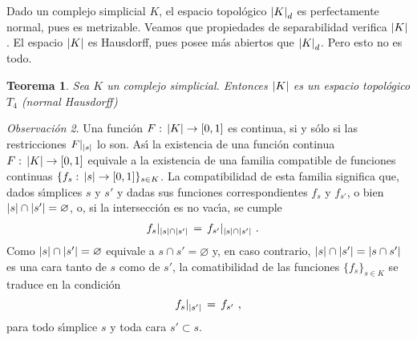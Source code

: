 \theoremstyle{plain}
\newtheorem{teoTodoComplejoEsNormal}{Teorema}[section]
\newtheorem{coroTodoComplejoEsPerfectamenteNormal}[teoTodoComplejoEsNormal]%
	{Corolario}
\newtheorem{coroCompactoContenidoEnFinitosSimplices}[teoTodoComplejoEsNormal]%
	{Corolario}
\newtheorem{coroComplejoFinitoEspacioCompacto}[teoTodoComplejoEsNormal]%
	{Corolario}
\newtheorem{coroTodoComplejoEsCompactamenteGenerado}[teoTodoComplejoEsNormal]%
	{Corolario}
\newtheorem{coroComplejoLocalmenteFinitoEspacioLocalmenteCompacto}%
	[teoTodoComplejoEsNormal]{Corolario}
\newtheorem{teoHomotopiasDeComplejos}[teoTodoComplejoEsNormal]{Teorema}
\newtheorem{coroSimpliceDeSubcomplejo}[teoTodoComplejoEsNormal]{Corolario}
\newtheorem{teoTodoComplejoEsNervio}[teoTodoComplejoEsNormal]{Teorema}

\theoremstyle{remark}
\newtheorem{obsFuncionesContinuasEnUnComplejo}[teoTodoComplejoEsNormal]%
	{Observaci\'{o}n}


Dado un complejo simplicial $K$, el espacio topol\'{o}gico $\left|K\right|_{d}$
es perfectamente normal, pues es metrizable. Veamos que propiedades de
separabilidad verifica $\left|K\right|$. El espacio $\left|K\right|$ es Hausdorff, pues
posee m\'{a}s abiertos que $\left|K\right|_{d}$. Pero esto no es todo.

\begin{teoTodoComplejoEsNormal}\label{thm:todocomplejoesnormal}
	Sea $K$ un complejo simplicial. Entonces $\left|K\right|$ es un
	espacio topol\'{o}gico $T_{4}$ (normal Hausdorff)
\end{teoTodoComplejoEsNormal}

\begin{obsFuncionesContinuasEnUnComplejo}%
	\label{obs:funcionescontinuasenuncomplejo}
	Una funci\'{o}n $F:\,\left|K\right|\rightarrow [0,1]$ es continua, si y
	s\'{o}lo si las restricciones $F|_{\left|s\right|}$ lo son. As\'{\i} la
	existencia de una funci\'{o}n continua $F:\,\left|K\right|\rightarrow [0,1]$
	equivale a la existencia de una familia compatible de funciones
	continuas $\{f_{s}:\,\left|s\right|\rightarrow [0,1]\}_{s\in K}$. La
	compatibilidad de esta familia significa que, dados s\'{\i}mplices
	$s$ y $s'$ y dadas sus funciones correspondientes $f_{s}$ y $f_{s'}$,
	o bien $\left|s\right|\cap\left|s'\right|=\varnothing$, o, si la intersecci\'{o}n
	es no vac\'{\i}a, se cumple
	\begin{align*}
		f_{s}|_{\left|s\right|\cap\left|s'\right|} & \,=\,
			f_{s'}|_{\left|s\right|\cap\left|s'\right|}
		\text{ .}
	\end{align*}
	Como $\left|s\right|\cap\left|s'\right|=\varnothing$ equivale a
	$s\cap s'=\varnothing$ y, en caso contrario,
	$\left|s\right|\cap\left|s'\right|=\left|s\cap s'\right|$ es una cara tanto de $s$ como
	de $s'$, la comatibilidad de las funciones $\{f_{s}\}_{s\in K}$ se
	traduce en la condici\'{o}n
	\begin{equation}
		\label{eq:funcionescontinuasenuncomplejo}
		f_{s}|_{\left|s'\right|} \,=\,f_{s'}
		\text{ ,}
	\end{equation}
	para todo s\'{\i}mplice $s$ y toda cara $s'\subset s$.
\end{obsFuncionesContinuasEnUnComplejo}

